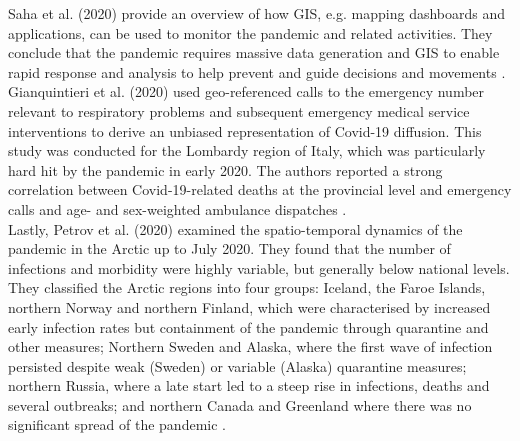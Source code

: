 Saha et al. (2020) provide an overview of how GIS, e.g. mapping dashboards and applications, can be used to monitor the pandemic and related activities. They conclude that the pandemic requires massive data generation and GIS to enable rapid response and analysis to help prevent and guide decisions and movements \autocite[][]{saha2020monitoring}. \\
Gianquintieri et al. (2020) used geo-referenced calls to the emergency number relevant to respiratory problems and subsequent emergency medical service interventions to derive an unbiased representation of Covid-19 diffusion. This study was conducted for the Lombardy region of Italy, which was particularly hard hit by the pandemic in early 2020. The authors reported a strong correlation between Covid-19-related deaths at the provincial level and emergency calls and age- and sex-weighted ambulance dispatches \autocite[][]{gianquintieri2020mapping}. \\
Lastly, Petrov et al. (2020) examined the spatio-temporal dynamics of the pandemic in the Arctic up to July 2020. They found that the number of infections and morbidity were highly variable, but generally below national levels. They classified the Arctic regions into four groups: Iceland, the Faroe Islands, northern Norway and northern Finland, which were characterised by increased early infection rates but containment of the pandemic through quarantine and other measures; Northern Sweden and Alaska, where the first wave of infection persisted despite weak (Sweden) or variable (Alaska) quarantine measures; northern Russia, where a late start led to a steep rise in infections, deaths and several outbreaks; and northern Canada and Greenland where there was no significant spread of the pandemic \autocite[][]{petrov2020spatiotemporal}.
